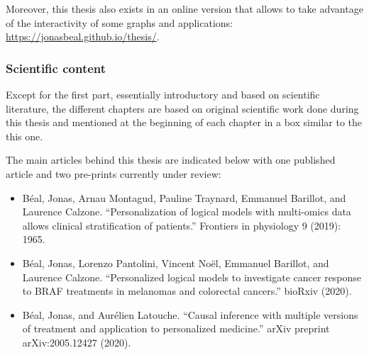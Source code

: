 \documentclass[a4paper,12pt,twoside,onecolumn,openright,final,oldfontcommands]{memoir}
\providecommand{\tightlist}{%
  \setlength{\itemsep}{0pt}\setlength{\parskip}{0pt}}
\newcommand{\clearemptydoublepage}{\newpage{\thispagestyle{empty}\cleardoublepage}}
\let\BeginKnitrBlock\begin \let\EndKnitrBlock\end
\begin{document}
Moreover, this thesis also exists in an online version that allows to
take advantage of the interactivity of some graphs and applications:
\url{https://jonasbeal.github.io/thesis/}.

\BeginKnitrBlock{summarybox}
\subsubsection*{Scientific content}\label{scientific-content}

Except for the first part, essentially introductory and based on
scientific literature, the different chapters are based on original
scientific work done during this thesis and mentioned at the beginning
of each chapter in a box similar to the this one.

The main articles behind this thesis are indicated below with one
published article and two pre-prints currently under review:

\begin{itemize}
\tightlist
\item
  Béal, Jonas, Arnau Montagud, Pauline Traynard, Emmanuel Barillot, and
  Laurence Calzone. ``Personalization of logical models with multi-omics
  data allows clinical stratification of patients.'' Frontiers in
  physiology 9 (2019): 1965.
\item
  Béal, Jonas, Lorenzo Pantolini, Vincent Noël, Emmanuel Barillot, and
  Laurence Calzone. ``Personalized logical models to investigate cancer
  response to BRAF treatments in melanomas and colorectal cancers.''
  bioRxiv (2020).
\item
  Béal, Jonas, and Aurélien Latouche. ``Causal inference with multiple
  versions of treatment and application to personalized medicine.''
  arXiv preprint arXiv:2005.12427 (2020).
\end{itemize}
\EndKnitrBlock{summarybox}

\clearemptydoublepage

\renewcommand{\contentsname}{Table of contents}


\tableofcontents*
{}
\newpage

\listoftables
{}
\newpage
\end{document}
